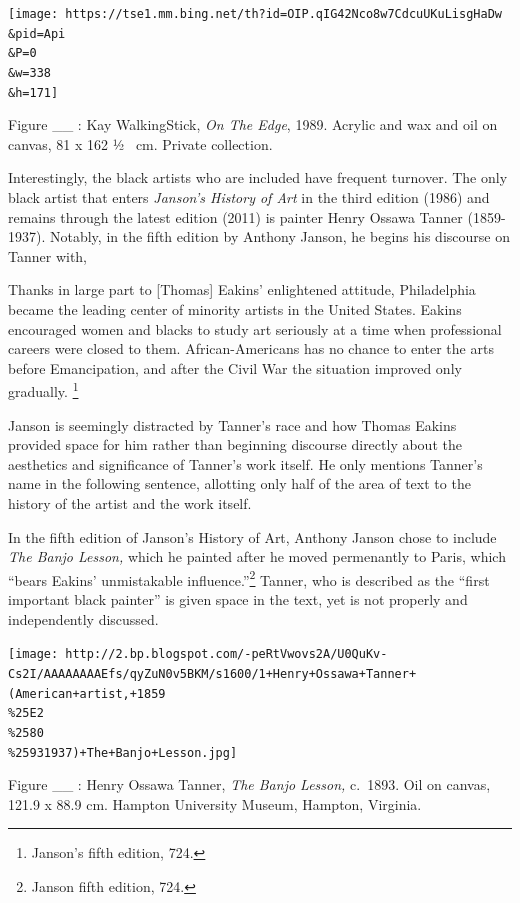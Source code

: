 \documentclass[
  letterpaper,
  DIV=11,
  numbers=noendperiod]{scrreprt}
\begin{document}
\texttt{[image: https://tse1.mm.bing.net/th?id=OIP.qIG42Nco8w7CdcuUKuLisgHaDw\\\&pid=Api\\\&P=0\\\&w=338\\\&h=171]}

Figure \_\_ : Kay WalkingStick, \emph{On The Edge}, 1989. Acrylic and
wax and oil on canvas, 81 x 162 ½~ cm. Private collection.

Interestingly, the black artists who are included have frequent
turnover. The only black artist that enters \emph{Janson's History of
Art} in the third edition (1986) and remains through the latest edition
(2011) is painter Henry Ossawa Tanner (1859-1937). Notably, in the fifth
edition by Anthony Janson, he begins his discourse on Tanner with,

Thanks in large part to {[}Thomas{]} Eakins' enlightened attitude,
Philadelphia became the leading center of minority artists in the United
States. Eakins encouraged women and blacks to study art seriously at a
time when professional careers were closed to them. African-Americans
has no chance to enter the arts before Emancipation, and after the Civil
War the situation improved only gradually. \footnote{Janson's fifth
  edition, 724.}

Janson is seemingly distracted by Tanner's race and how Thomas Eakins
provided space for him rather than beginning discourse directly about
the aesthetics and significance of Tanner's work itself. He only
mentions Tanner's name in the following sentence, allotting only half of
the area of text to the history of the artist and the work itself.

In the fifth edition of Janson's History of Art, Anthony Janson chose to
include \emph{The Banjo Lesson,} which he painted after he moved
permenantly to Paris, which ``bears Eakins' unmistakable
influence.''\footnote{Janson fifth edition, 724.} Tanner, who is
described as the ``first important black painter'' is given space in the
text, yet is not properly and independently discussed.

\texttt{[image: http://2.bp.blogspot.com/-peRtVwovs2A/U0QuKv-Cs2I/AAAAAAAAEfs/qyZuN0v5BKM/s1600/1+Henry+Ossawa+Tanner+(American+artist,+1859\\\%25E2\\\%2580\\\%25931937)+The+Banjo+Lesson.jpg]}

Figure \_\_ : Henry Ossawa Tanner, \emph{The Banjo Lesson,} c.~1893. Oil
on canvas, 121.9 x 88.9 cm. Hampton University Museum, Hampton,
Virginia.
\end{document}
